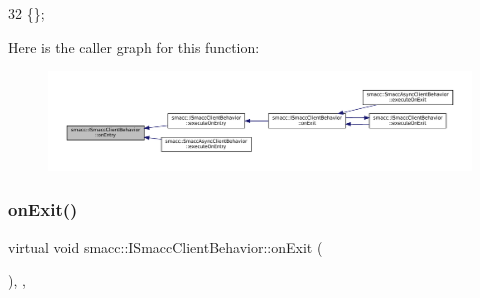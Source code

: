 \begin{DoxyCode}
32 \{\};
\end{DoxyCode}
Here is the caller graph for this function\+:
\nopagebreak
\begin{figure}[H]
\begin{center}
\leavevmode
\includegraphics[width=350pt]{classsmacc_1_1ISmaccClientBehavior_a3ec24a839087c550e1d62a81e48cf530_icgraph}
\end{center}
\end{figure}
\mbox{\label{classsmacc_1_1ISmaccClientBehavior_a36bf771905e3bf750909a15e4215a9b3}} 
\subsubsection{\texorpdfstring{on\+Exit()}{onExit()}}
{\footnotesize\ttfamily virtual void smacc\+::\+I\+Smacc\+Client\+Behavior\+::on\+Exit (\begin{DoxyParamCaption}{ }\end{DoxyParamCaption})\hspace{0.3cm}{\ttfamily [inline]}, {\ttfamily [protected]}, {\ttfamily [virtual]}}



